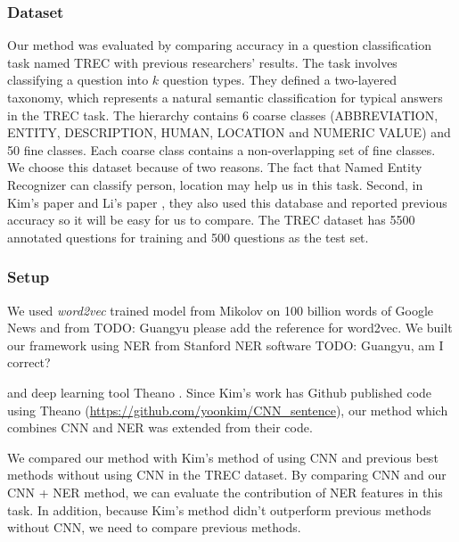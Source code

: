 \documentclass[10pt,twocolumn,letterpaper]{article}
\begin{document}
\subsubsection{Dataset}
Our method was evaluated by comparing accuracy in a question classification task named TREC \cite{li2006learning} with previous researchers' results. The task involves classifying a question into $k$ question types. They defined a two-layered taxonomy, which represents a  natural semantic classification for typical answers in the TREC task. The hierarchy contains 6 coarse classes (ABBREVIATION, ENTITY, DESCRIPTION, HUMAN, LOCATION and NUMERIC VALUE) and 50 fine classes. Each coarse  class contains a non-overlapping set of fine classes. We choose this dataset because of two reasons. The fact that Named Entity Recognizer can classify person, location may help us in this task. Second, in Kim's paper \cite{kim2014convolutional} and Li's paper \cite{li2006learning}, they also used this database and reported previous accuracy so it will be easy for us to compare. The TREC dataset has 5500 annotated questions for training and 500 questions as the test set.

\subsubsection{Setup}
We used \textit{word2vec} trained model from Mikolov \cite{mikolov2013efficient} on 100 billion words of Google News and from TODO: Guangyu please add the reference for word2vec. We built our framework using NER from Stanford NER software \cite{finkel2005incorporating} TODO: Guangyu, am I correct? 

and deep learning tool Theano \cite{Bastien-Theano-2012}. Since Kim's work\cite{kim2014convolutional} has Github published code using Theano (\url{https://github.com/yoonkim/CNN_sentence}), our method which combines CNN and NER was extended from their code. 

We compared our method with Kim's method of using CNN and previous best methods without using CNN in the TREC dataset. By comparing CNN and our CNN + NER method, we can evaluate the contribution of NER features in this task. In addition, because Kim's method didn't outperform previous methods without CNN, we need to compare previous methods.
\end{document}
